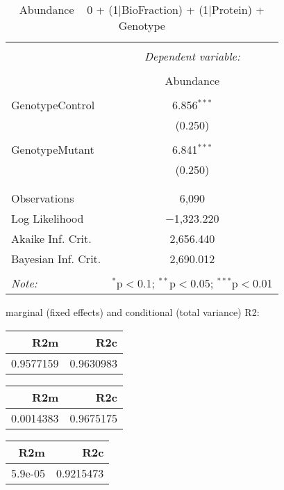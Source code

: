 \documentclass[11pt]{report}
\begin{document}
\begin{table}[!htbp] \centering 
  \caption{Abundance ~ 0 + (1|BioFraction) + (1|Protein) + Genotype} 
  \label{} 
\begin{tabular}{@{\extracolsep{5pt}}lc} 
\\[-1.8ex]\hline 
\hline \\[-1.8ex] 
 & \multicolumn{1}{c}{\textit{Dependent variable:}} \\ 
\cline{2-2} 
\\[-1.8ex] & Abundance \\ 
\hline \\[-1.8ex] 
 GenotypeControl & 6.856$^{***}$ \\ 
  & (0.250) \\ 
  & \\ 
 GenotypeMutant & 6.841$^{***}$ \\ 
  & (0.250) \\ 
  & \\ 
\hline \\[-1.8ex] 
Observations & 6,090 \\ 
Log Likelihood & $-$1,323.220 \\ 
Akaike Inf. Crit. & 2,656.440 \\ 
Bayesian Inf. Crit. & 2,690.012 \\ 
\hline 
\hline \\[-1.8ex] 
\textit{Note:}  & \multicolumn{1}{r}{$^{*}$p$<$0.1; $^{**}$p$<$0.05; $^{***}$p$<$0.01} \\ 
\end{tabular} 
\end{table} 
marginal (fixed effects) and conditional (total variance) R2:

\begin{tabular}{r|r}
\hline
R2m & R2c\\
\hline
0.9577159 & 0.9630983\\
\hline
\end{tabular}

\begin{tabular}{r|r}
\hline
R2m & R2c\\
\hline
0.0014383 & 0.9675175\\
\hline
\end{tabular}

\begin{tabular}{r|r}
\hline
R2m & R2c\\
\hline
5.9e-05 & 0.9215473\\
\hline
\end{tabular}
\end{document}

